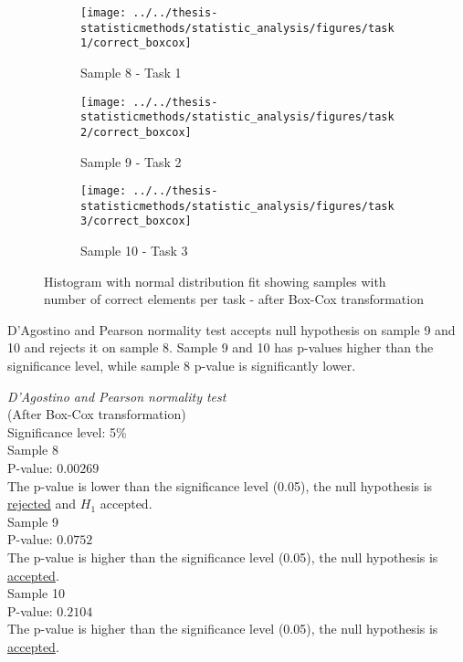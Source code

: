 \begin{figure}[h!]
	\centering
	\begin{subfigure}[b]{0.3\textwidth}
		\centering
		\texttt{[image: ../../thesis-statisticmethods/statistic\_analysis/figures/task1/correct\_boxcox]}
		\caption{Sample 8 - Task 1}
		\label{fig:correctboxcox_task1}
	\end{subfigure}
	\begin{subfigure}[b]{0.3\textwidth}
		\centering
		\texttt{[image: ../../thesis-statisticmethods/statistic\_analysis/figures/task2/correct\_boxcox]}
		\caption{Sample 9 - Task 2}
		\label{fig:correctboxcox_task2}
	\end{subfigure}
	\begin{subfigure}[b]{0.3\textwidth}
		\centering
		\texttt{[image: ../../thesis-statisticmethods/statistic\_analysis/figures/task3/correct\_boxcox]}
		\caption{Sample 10 - Task 3}
		\label{fig:correctboxcox_task3}
	\end{subfigure}
	\caption{Histogram with normal distribution fit showing samples with number of correct elements per task - after Box-Cox transformation}
\end{figure}

D'Agostino and Pearson normality test accepts null hypothesis on sample 9 and 10 and rejects it on sample 8. Sample 9 and 10 has p-values higher than the significance level, while sample 8 p-value is significantly lower. 

 \begin{center}
	\begin{tcolorbox}[width=0.80\textwidth]
		\centering
		\textit{D'Agostino and Pearson normality test}\\
		(After Box-Cox transformation) \\
		Significance level: 5\%  \\[0.5cm]
		
		Sample 8\\
		P-value: $0.00269$\\
		The p-value is lower than the significance level (0.05), the null hypothesis is \underline{rejected} and $H_1$ accepted.\\[0.5cm]
		
		Sample 9 \\
		P-value: $0.0752$ \\
		The p-value is higher than the significance level (0.05), the null hypothesis is \underline{accepted}. \\[0.5cm]
		
		Sample 10 \\
		P-value: $0.2104$ \\
		The p-value is higher than the significance level (0.05), the null hypothesis is \underline{accepted}. \\[0.5cm]
	\end{tcolorbox} 
\end{center}


